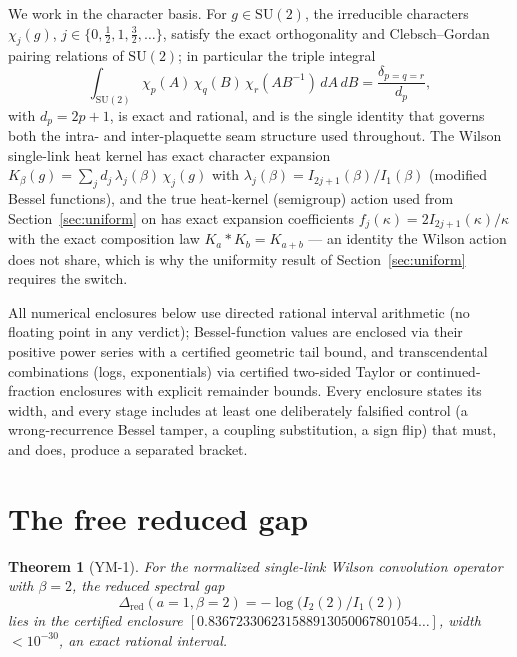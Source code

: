 \documentclass[aps,prd,twocolumn,superscriptaddress,nofootinbib]{revtex4-2}
\newcommand{\SU}{\mathrm{SU}(2)}
\newtheorem{theorem}{Theorem}
\begin{document}
We work in the character basis. For $g\in\SU$, the irreducible
characters $\chi_j(g)$, $j\in\{0,\tfrac12,1,\tfrac32,\dots\}$, satisfy the
exact orthogonality and Clebsch--Gordan pairing relations of $\SU$; in
particular the triple integral
\begin{equation}
\int_{\SU}\chi_p(A)\,\chi_q(B)\,\chi_r(AB^{-1})\,dA\,dB
= \frac{\delta_{p=q=r}}{d_p},
\end{equation}
with $d_p=2p+1$, is exact and rational, and is the single identity that
governs both the intra- and inter-plaquette seam structure used
throughout. The Wilson single-link heat kernel has exact character
expansion $K_\beta(g)=\sum_j d_j\,\lambda_j(\beta)\,\chi_j(g)$ with
$\lambda_j(\beta)=I_{2j+1}(\beta)/I_1(\beta)$ (modified Bessel functions),
and the true heat-kernel (semigroup) action used from
Section~\ref{sec:uniform} on has exact expansion coefficients
$f_j(\kappa)=2I_{2j+1}(\kappa)/\kappa$ with the exact composition law
$K_a * K_b = K_{a+b}$ --- an identity the Wilson action does not share,
which is why the uniformity result of Section~\ref{sec:uniform} requires
the switch.

All numerical enclosures below use directed rational interval arithmetic
(no floating point in any verdict); Bessel-function values are enclosed
via their positive power series with a certified geometric tail bound, and
transcendental combinations (logs, exponentials) via certified two-sided
Taylor or continued-fraction enclosures with explicit remainder bounds.
Every enclosure states its width, and every stage includes at least one
deliberately falsified control (a wrong-recurrence Bessel tamper, a
coupling substitution, a sign flip) that must, and does, produce a
separated bracket.

\section{The free reduced gap}\label{sec:free}

\begin{theorem}[YM-1]\label{thm:ym1}
For the normalized single-link Wilson convolution operator with
$\beta=2$, the reduced spectral gap
\begin{equation}
\Delta_{\mathrm{red}}(a{=}1,\beta{=}2) = -\log\!\big(I_2(2)/I_1(2)\big)
\end{equation}
lies in the certified enclosure
$[0.836723306231588913050067801054\ldots]$, width $<10^{-30}$, an exact
rational interval.
\end{theorem}
\end{document}
